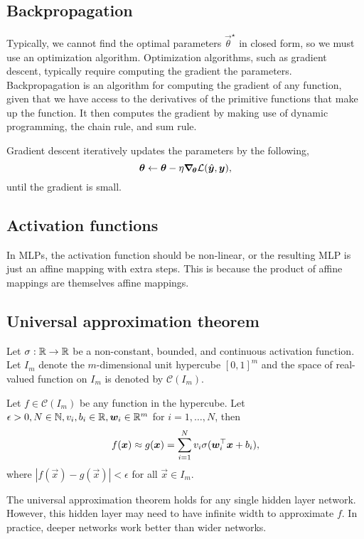 \subsection{Backpropagation}

Typically, we cannot find the optimal parameters $\vec{\theta}^\star$ in closed form, so we must
use an optimization algorithm. Optimization algorithms, such as gradient descent, typically require
computing the gradient \wrt the parameters. Backpropagation is an algorithm for computing the
gradient of any function, given that we have access to the derivatives of the primitive functions
that make up the function. It
then computes the gradient by making use of dynamic programming, the chain rule, and sum rule.

Gradient descent iteratively updates the parameters by the following, \[
    \bm{\theta} \gets \bm{\theta} - \eta \bm{\nabla}_{\! \bm{\theta}} \mathcal{L}(\hat{\bm{y}},\bm{y}),
\]
until the gradient is small.

\subsection{Activation functions}

In MLPs, the activation function should be non-linear, or the resulting MLP is just an affine
mapping with extra steps. This is because the product of affine mappings are themselves affine
mappings.

\subsection{Universal approximation theorem}

\begin{theorem}
    Let $\sigma: \mathbb{R}\to \mathbb{R}$ be a non-constant, bounded, and continuous activation function.
    Let $I_m$ denote the $m$-dimensional unit hypercube $[0,1]^m$ and the space of real-valued
    function on $I_m$ is denoted by $\mathcal{C}(I_m)$.

    Let $f \in \mathcal{C}(I_m)$ be any function in the hypercube. Let $\epsilon > 0, N\in \mathbb{N},
        v_i,b_i \in \mathbb{R}, \bm{w}_i \in \mathbb{R}^m$ for $i=1,\ldots,N$, then \[
        f(\bm{x}) \approx g(\bm{x}) = \sum_{i=1}^{N} v_i \sigma(\bm{w}_i^\top \bm{x} + b_i),
    \]
    where $|f(\vec{x}) - g(\vec{x})| < \epsilon$ for all $\vec{x}\in I_m$.
\end{theorem}

The universal approximation theorem holds for any single hidden layer network. However, this hidden
layer may need to have infinite width to approximate $f$. In practice, deeper networks work better
than wider networks.
